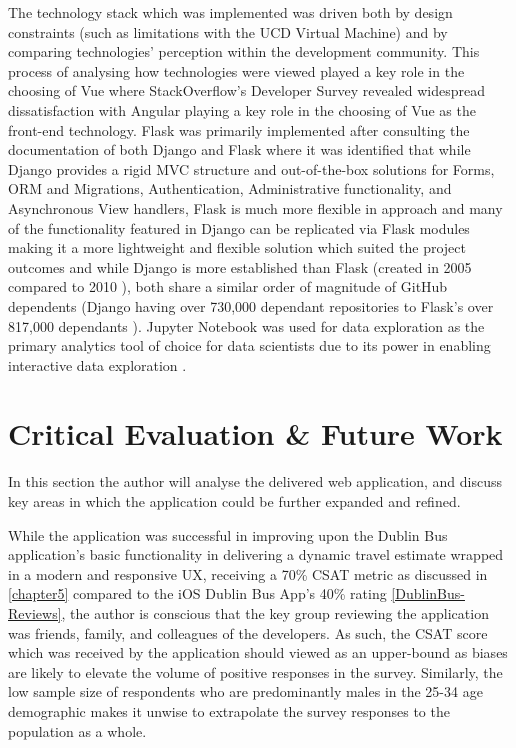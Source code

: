 \documentclass[]{UCD_CS_47360_Report}
\begin{document}
The technology stack which was implemented was driven both by design constraints (such as limitations with the UCD Virtual Machine) and by comparing technologies' perception within the development community. This process of analysing how technologies were viewed played a key role in the choosing of Vue \cite{SO-SurveyFrontEnd} where StackOverflow's Developer Survey revealed widespread dissatisfaction with Angular playing a key role in the choosing of Vue as the front-end technology. Flask was primarily implemented after consulting the documentation of both Django \cite{WhyDjango} and Flask \cite{WhyFlask} where it was identified that while Django provides a rigid MVC structure and out-of-the-box solutions for Forms, ORM and Migrations, Authentication, Administrative functionality, and Asynchronous View handlers, Flask is much more flexible in approach and many of the functionality featured in Django can be replicated via Flask modules making it a more lightweight and flexible solution which suited the project outcomes and while Django is more established than Flask (created in 2005 \cite{Django-Source} compared to 2010 \cite{Flask-Source}), both share a similar order of magnitude of GitHub dependents (Django having over 730,000 dependant repositories \cite{Django-Dep} to Flask's over 817,000 dependants \cite{Flask-Dep}). Jupyter Notebook was used for data exploration as the primary analytics tool of choice for data scientists due to its power in enabling interactive data exploration \cite{Jupyter}.

\chapter{\label{chapter8} Critical Evaluation \& Future Work}
In this section the author will analyse the delivered web application, and discuss key areas in which the application could be further expanded and refined.

While the application was successful in improving upon the Dublin Bus application's basic functionality in delivering a dynamic travel estimate wrapped in a modern and responsive UX, receiving a 70\% CSAT metric as discussed in \ref{chapter5} compared to the iOS Dublin Bus App's 40\% rating \ref{DublinBus-Reviews}, the author is conscious that the key group reviewing the application was friends, family, and colleagues of the developers. As such, the CSAT score which was received by the application should viewed as an upper-bound as biases are likely to elevate the volume of positive responses in the survey. Similarly, the low sample size of respondents who are predominantly males in the 25-34 age demographic makes it unwise to extrapolate the survey responses to the population as a whole. 
\end{document}
